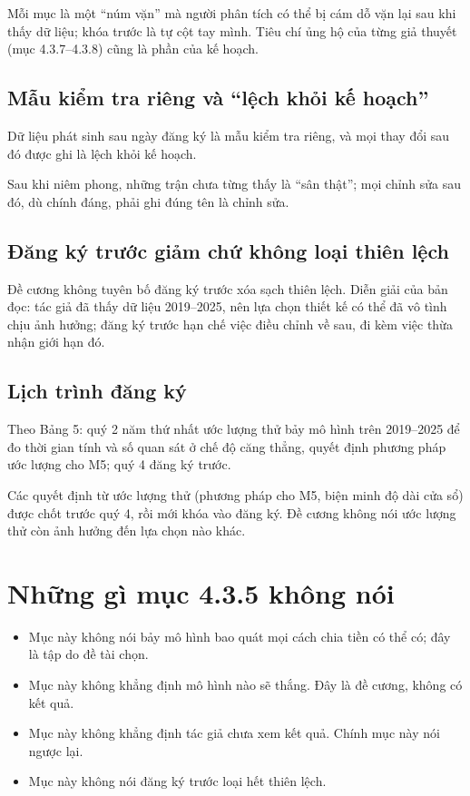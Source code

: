 Mỗi mục là một “núm vặn” mà người phân tích có thể bị cám dỗ vặn lại sau khi thấy dữ liệu; khóa trước là tự cột tay mình. Tiêu chí ủng hộ của từng giả thuyết (mục 4.3.7--4.3.8) cũng là phần của kế hoạch.

\subsection{Mẫu kiểm tra riêng và “lệch khỏi kế hoạch”}

Dữ liệu phát sinh sau ngày đăng ký là mẫu kiểm tra riêng, và mọi thay đổi sau đó được ghi là lệch khỏi kế hoạch.

Sau khi niêm phong, những trận chưa từng thấy là “sân thật”; mọi chỉnh sửa sau đó, dù chính đáng, phải ghi đúng tên là chỉnh sửa.

\subsection{Đăng ký trước giảm chứ không loại thiên lệch}

Đề cương không tuyên bố đăng ký trước xóa sạch thiên lệch. Diễn giải của bản đọc: tác giả đã thấy dữ liệu 2019--2025, nên lựa chọn thiết kế có thể đã vô tình chịu ảnh hưởng; đăng ký trước hạn chế việc điều chỉnh về sau, đi kèm việc thừa nhận giới hạn đó.

\subsection{Lịch trình đăng ký}

Theo Bảng 5: quý 2 năm thứ nhất ước lượng thử bảy mô hình trên 2019--2025 để đo thời gian tính và số quan sát ở chế độ căng thẳng, quyết định phương pháp ước lượng cho M5; quý 4 đăng ký trước.

Các quyết định từ ước lượng thử (phương pháp cho M5, biện minh độ dài cửa sổ) được chốt trước quý 4, rồi mới khóa vào đăng ký. Đề cương không nói ước lượng thử còn ảnh hưởng đến lựa chọn nào khác.

\section{Những gì mục 4.3.5 không nói}

\begin{itemize}
\item
  Mục này không nói bảy mô hình bao quát mọi cách chia tiền có thể có; đây là tập do đề tài chọn.
\item
  Mục này không khẳng định mô hình nào sẽ thắng. Đây là đề cương, không có kết quả.
\item
  Mục này không khẳng định tác giả chưa xem kết quả. Chính mục này nói ngược lại.
\item
  Mục này không nói đăng ký trước loại hết thiên lệch.
\end{itemize}

